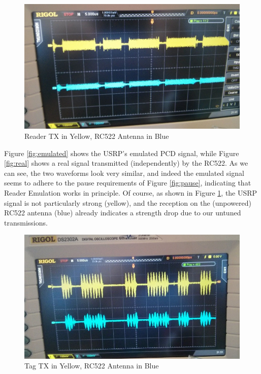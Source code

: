 \documentclass[fleqn,10pt]{SelfArx} %
\begin{document}
\begin{figure}[tp]
  \includegraphics[width=\linewidth]{img/readertx}
  \caption{Reader TX in Yellow, RC522 Antenna in Blue}
  \label{fig:readertx}
\end{figure}


Figure \ref{fig:emulated} shows the USRP's emulated PCD signal, while Figure \ref{fig:real} shows a real signal transmitted (independently) by the RC522. As we can see, the two waveforms look very similar, and indeed the emulated signal seems to adhere to the pause requirements of Figure \ref{fig:pause}, indicating that Reader Emulation works in principle. Of course, as shown in Figure \ref{fig:readertx}, the USRP signal is not particularly strong (yellow), and the reception on the (unpowered) RC522 antenna (blue) already indicates a strength drop due to our untuned transmissions.


\begin{figure}[tp]
  \includegraphics[width=\linewidth]{img/tagtx}
  \caption{Tag TX in Yellow, RC522 Antenna in Blue}
  \label{fig:tagtx}
\end{figure}
\end{document}
